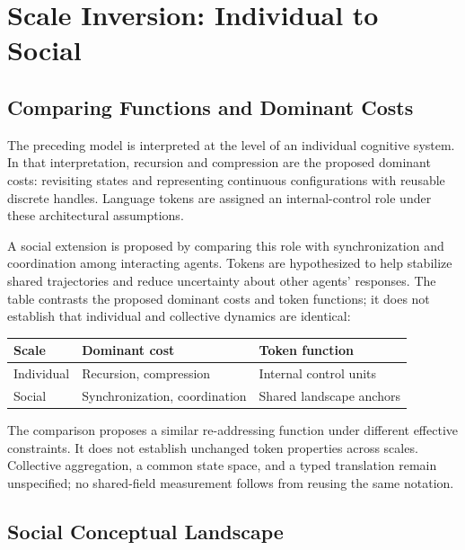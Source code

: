 
\section{Scale Inversion: Individual to Social}
\label{sec:multiscale}

\subsection{Comparing Functions and Dominant Costs}

The preceding model is interpreted at the level of an individual
cognitive system. In that interpretation, recursion and compression are
the proposed dominant costs: revisiting states and representing continuous
configurations with reusable discrete handles.
Language tokens are assigned an internal-control role under these
architectural assumptions.

A social extension is proposed by comparing this role with
synchronization and coordination among interacting agents.
Tokens are hypothesized to help stabilize shared trajectories and reduce
uncertainty about other agents' responses.
The table contrasts the proposed dominant costs and token functions;
it does not establish that individual and collective dynamics are identical:

\begin{center}
\begin{tabular}{lll}
\toprule
\textbf{Scale} & \textbf{Dominant cost} & \textbf{Token function} \\
\midrule
Individual & Recursion, compression & Internal control units \\
Social     & Synchronization, coordination & Shared landscape anchors \\
\bottomrule
\end{tabular}
\end{center}

The comparison proposes a similar re-addressing function under different
effective constraints. It does not establish unchanged token properties
across scales. Collective aggregation, a common state space, and a typed
translation remain unspecified; no shared-field measurement follows
from reusing the same notation.

\subsection{Social Conceptual Landscape}

